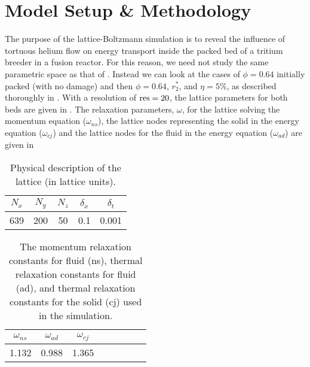 \section{Model Setup \& Methodology}
The purpose of the lattice-Boltzmann simulation is to reveal the influence of tortuous helium flow on energy transport inside the packed bed of a tritium breeder in a fusion reactor. For this reason, we need not study the same parametric space as that of . Instead we can look at the cases of $\phi = 0.64$ initially packed (with no damage) and then $\phi = 0.64$, $r_2^*$, and $\eta = 5\%$, as described thoroughly in . With a resolution of $\text{res} = 20$, the lattice parameters for both beds are given in . The relaxation parameters, $\omega$, for the lattice solving the momentum equation ($\omega_{ns}$), the lattice nodes representing the solid in the energy equation ($\omega_{cj}$) and the lattice nodes for the fluid in the energy equation ($\omega_{ad}$) are given in 


\begin {table}[h] %
\caption{Physical description of the lattice (in lattice units).}
\label{tab:lbm-parameters} \centering %
\begin {tabular}{ ccccc }
\toprule %
$N_x$   &   $N_y$  &   $N_z$    &   $\delta_x$   & $\delta_t$    \\\toprule
639      &   200     &   50     &    0.1         &  0.001        \\\bottomrule
\end{tabular}
\end{table}

\begin {table}[h] %
\caption{The momentum relaxation constants for fluid (ns), thermal relaxation constants for fluid (ad), and thermal relaxation constants for the solid (cj) used in the simulation.}
\label{tab:lbm-relaxations} \centering %
\begin {tabular}{ cccccccc }
\toprule %
$\omega_{ns}$ &  $\omega_{ad}$  &   $\omega_{cj}$     \\\toprule
1.132      &  0.988       &   1.365          \\\bottomrule
\end{tabular}
\end{table}

